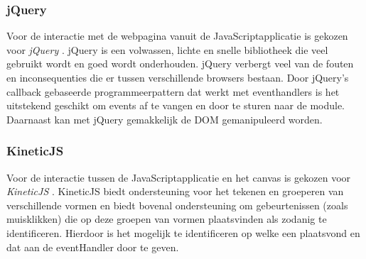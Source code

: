 \subsubsection{jQuery}
Voor de interactie met de webpagina vanuit de JavaScriptapplicatie is gekozen voor \emph{jQuery} \cite{jQuery}. jQuery is een volwassen, lichte en snelle bibliotheek die veel gebruikt wordt en goed wordt onderhouden. jQuery verbergt veel van de fouten en inconsequenties die er tussen verschillende browsers bestaan. Door jQuery's callback gebaseerde programmeerpattern dat werkt met eventhandlers is het uitstekend geschikt om events af te vangen en door te sturen naar de module. Daarnaast kan met jQuery gemakkelijk de DOM gemanipuleerd worden.

\subsubsection{KineticJS}
Voor de interactie tussen de JavaScriptapplicatie en het canvas is gekozen voor \emph{KineticJS} \cite{KineticJS}. KineticJS biedt ondersteuning voor het tekenen en groeperen van verschillende vormen en biedt bovenal ondersteuning om gebeurtenissen (zoals muisklikken) die op deze groepen van vormen plaatsvinden als zodanig te identificeren. Hierdoor is het mogelijk te identificeren op welke  een  plaatsvond en dat aan de eventHandler door te geven.
